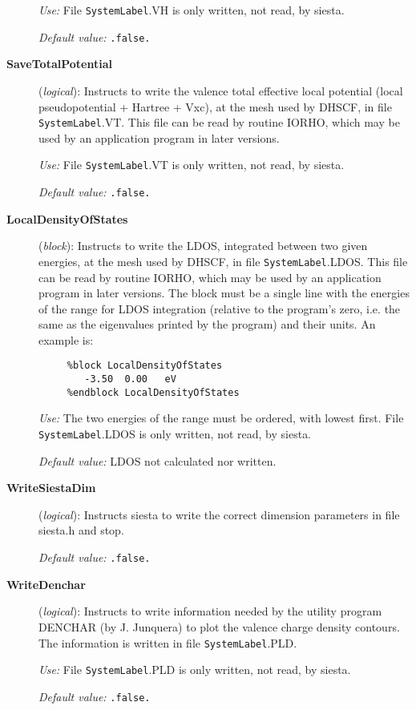 \begin{description}
{\it Use:} File {\tt SystemLabel}.VH is only written, not read, by siesta.

{\it Default value:} {\tt .false.}
        

\item[{\bf SaveTotalPotential}] ({\it logical}): 
Instructs to write the valence total effective local potential
(local pseudopotential + Hartree + Vxc), at the
mesh used by DHSCF,
in file {\tt SystemLabel}.VT. This file can be read by routine IORHO,
which may be used by an application program in later versions.

{\it Use:} File {\tt SystemLabel}.VT is only written, not read, by siesta.

{\it Default value:} {\tt .false.}
        

\item[{\bf LocalDensityOfStates}] ({\it block}): 
Instructs to write the LDOS, integrated between two given energies,
at the mesh used by DHSCF,
in file {\tt SystemLabel}.LDOS. This file can be read by routine IORHO,
which may be used by an application program in later versions.
The block must be a single line with the energies of the range for 
LDOS integration
(relative to the program's zero, i.e. the same as the eigenvalues
printed by the program) and their units.
An example is:

\begin{verbatim}
     %block LocalDensityOfStates
        -3.50  0.00   eV
     %endblock LocalDensityOfStates
\end{verbatim}

{\it Use:} The two energies of the range must be ordered,
with lowest first.
File {\tt SystemLabel}.LDOS is only written, not read, by siesta.

{\it Default value:} LDOS not calculated nor written.
        

\item[{\bf WriteSiestaDim}] ({\it logical}): 
Instructs siesta to write the correct dimension parameters in
file siesta.h and stop.

{\it Default value:} {\tt .false.}

\item[{\bf WriteDenchar}] ({\it logical}): 
Instructs to write information needed by the utility program
DENCHAR (by J. Junquera) to plot the valence charge density
contours. The information is written in file {\tt SystemLabel}.PLD.

{\it Use:} File {\tt SystemLabel}.PLD is only written, not read, by siesta.

{\it Default value:} {\tt .false.}

\end{description}
        

